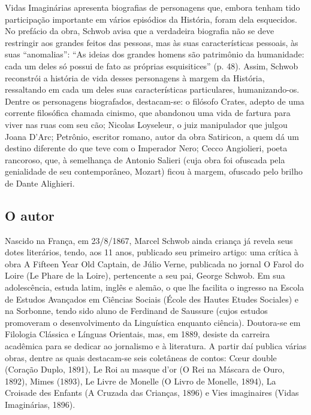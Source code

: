\documentclass[12pt]{extarticle}
\begin{document}
Vidas Imaginárias apresenta biografias de personagens que, embora tenham
tido participação importante em vários episódios da História, foram dela
esquecidos. No prefácio da obra, Schwob avisa que a verdadeira biografia
não se deve restringir aos grandes feitos das pessoas, mas às suas
características pessoais, às suas ``anomalias'': ``As ideias dos grandes
homens são patrimônio da humanidade: cada um deles só possui de fato as
próprias esquisitices'' (p. 48). Assim, Schwob reconstrói a história de
vida desses personagens à margem da História, ressaltando em cada um
deles suas características particulares, humanizando-os. Dentre os
personagens biografados, destacam-se: o filósofo Crates, adepto de uma
corrente filosófica chamada cinismo, que abandonou uma vida de fartura
para viver nas ruas com seu cão; Nicolas Loyseleur, o juiz manipulador
que julgou Joana D'Arc; Petrônio, escritor romano, autor da obra
Satiricon, a quem dá um destino diferente do que teve com o Imperador
Nero; Cecco Angiolieri, poeta rancoroso, que, à semelhança de Antonio
Salieri (cuja obra foi ofuscada pela genialidade de seu contemporâneo,
Mozart) ficou à margem, ofuscado pelo brilho de Dante Alighieri.

\subsection{O autor}




Nascido na França, em 23/8/1867, Marcel Schwob ainda criança já revela
seus dotes literários, tendo, aos 11 anos, publicado seu primeiro
artigo: uma crítica à obra A Fifteen Year Old Captain, de Júlio Verne,
publicada no jornal O Farol do Loire (Le Phare de la Loire), pertencente
a seu pai, George Schwob. Em sua adolescência, estuda latim, inglês e
alemão, o que lhe facilita o ingresso na Escola de Estudos Avançados em
Ciências Sociais (École des Hautes Etudes Sociales) e na Sorbonne, tendo
sido aluno de Ferdinand de Saussure (cujos estudos promoveram o
desenvolvimento da Linguística enquanto ciência). Doutora-se em
Filologia Clássica e Línguas Orientais, mas, em 1889, desiste da
carreira acadêmica para se dedicar ao jornalismo e à literatura. A
partir daí publica várias obras, dentre as quais destacam-se seis
coletâneas de contos: Cœur double (Coração Duplo, 1891), Le Roi au
masque d'or (O Rei na Máscara de Ouro, 1892), Mimes (1893), Le Livre de
Monelle (O Livro de Monelle, 1894), La Croisade des Enfants (A Cruzada
das Crianças, 1896) e Vies imaginaires (Vidas Imaginárias, 1896).
\end{document}
